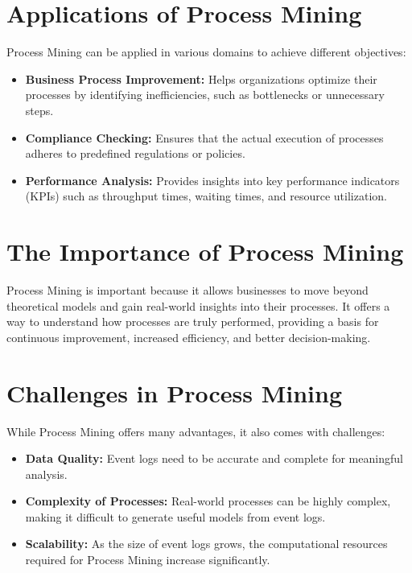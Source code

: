     \section{Applications of Process Mining}
    Process Mining can be applied in various domains to achieve different objectives:
    \begin{itemize}
        \item \textbf{Business Process Improvement:} Helps organizations optimize their processes by identifying inefficiencies, such as bottlenecks or unnecessary steps.
        \item \textbf{Compliance Checking:} Ensures that the actual execution of processes adheres to predefined regulations or policies.
        \item \textbf{Performance Analysis:} Provides insights into key performance indicators (KPIs) such as throughput times, waiting times, and resource utilization.
    \end{itemize}
    
    \section{The Importance of Process Mining}
    Process Mining is important because it allows businesses to move beyond theoretical models and gain real-world insights into their processes. It offers a way to understand how processes are truly performed, providing a basis for continuous improvement, increased efficiency, and better decision-making.
    
    \section{Challenges in Process Mining}
    While Process Mining offers many advantages, it also comes with challenges:
    \begin{itemize}
        \item \textbf{Data Quality:} Event logs need to be accurate and complete for meaningful analysis.
        \item \textbf{Complexity of Processes:} Real-world processes can be highly complex, making it difficult to generate useful models from event logs.
        \item \textbf{Scalability:} As the size of event logs grows, the computational resources required for Process Mining increase significantly.
    \end{itemize}
